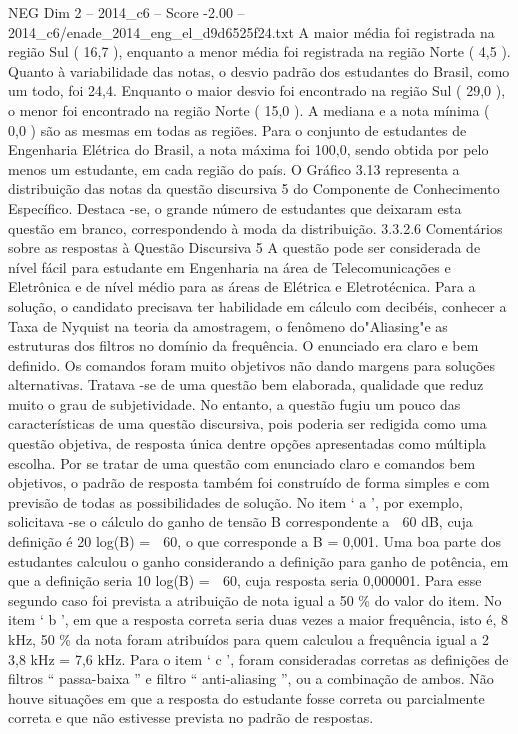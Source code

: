 \begin{textsample}{NEG Dim 2 – 2014\_c6 – Score -2.00 – 2014\_c6/enade\_2014\_eng\_el\_d9d6525f24.txt}
A maior média foi registrada na região Sul ( 16,7 ), enquanto a menor média foi registrada na região Norte ( 4,5 ).
Quanto à variabilidade das notas, o desvio padrão dos estudantes do Brasil, como um todo, foi 24,4.
Enquanto o maior desvio foi encontrado na região Sul ( 29,0 ), o menor foi encontrado na região Norte ( 15,0 ).
A mediana e a nota mínima ( 0,0 ) são as mesmas em todas as regiões.
Para o conjunto de estudantes de Engenharia Elétrica do Brasil, a nota máxima foi 100,0, sendo obtida por pelo menos um estudante, em cada região do país.
O Gráfico 3.13 representa a distribuição das notas da questão discursiva 5 do Componente de Conhecimento Específico.
Destaca -se, o grande número de estudantes que deixaram esta questão em branco, correspondendo à moda da distribuição. 3.3.2.6 Comentários sobre as respostas à Questão Discursiva 5 A questão pode ser considerada de nível fácil para estudante em Engenharia na área de Telecomunicações e Eletrônica e de nível médio para as áreas de Elétrica e Eletrotécnica.
Para a solução, o candidato precisava ter habilidade em cálculo com decibéis, conhecer a Taxa de Nyquist na teoria da amostragem, o fenômeno do"Aliasing"e as estruturas dos filtros no domínio da frequência.
O enunciado era claro e bem definido.
Os comandos foram muito objetivos não dando margens para soluções alternativas.
Tratava -se de uma questão bem elaborada, qualidade que reduz muito o grau de subjetividade.
No entanto, a questão fugiu um pouco das características de uma questão discursiva, pois poderia ser redigida como uma questão objetiva, de resposta única dentre opções apresentadas como múltipla escolha.
Por se tratar de uma questão com enunciado claro e comandos bem objetivos, o padrão de resposta também foi construído de forma simples e com previsão de todas as possibilidades de solução.
No item ‘ a ’, por exemplo, solicitava -se o cálculo do ganho de tensão B correspondente a  60 dB, cuja definição é 20 log(B) =  60, o que corresponde a B = 0,001.
Uma boa parte dos estudantes calculou o ganho considerando a definição para ganho de potência, em que a definição seria 10 log(B) =  60, cuja resposta seria 0,000001.
Para esse segundo caso foi prevista a atribuição de nota igual a 50 \% do valor do item.
No item ‘ b ’, em que a resposta correta seria duas vezes a maior frequência, isto é, 8 kHz, 50 \% da nota foram atribuídos para quem calculou a frequência igual a 2  3,8 kHz = 7,6 kHz.
Para o item ‘ c ’, foram consideradas corretas as definições de filtros “ passa-baixa ” e filtro “ anti-aliasing ”, ou a combinação de ambos.
Não houve situações em que a resposta do estudante fosse correta ou parcialmente correta e que não estivesse prevista no padrão de respostas.

\end{textsample}
